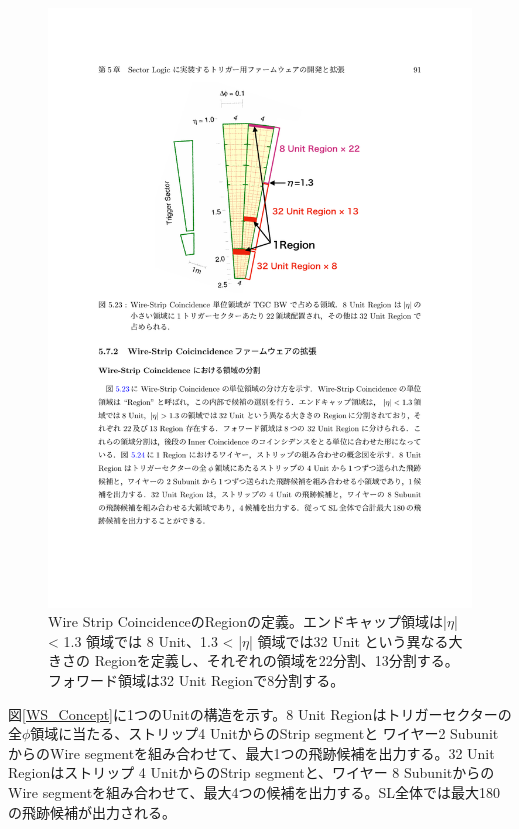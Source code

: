\begin{figure} 
\centering
\includegraphics[width=12cm]{fig/SL/WS_region.pdf}
\caption[Wire Strip Coincidence以降のRegionの分割]{Wire Strip CoincidenceのRegionの定義\cite{mt_kawamoto}。エンドキャップ領域は|$\eta$| < 1.3 領域では 8 Unit、1.3 < |$\eta$| 領域では32 Unit という異なる大きさの Regionを定義し、それぞれの領域を22分割、13分割する。フォワード領域は32 Unit Regionで8分割する。
}
\label{WS_region}
\end{figure}

図\ref{WS_Concept}に1つのUnitの構造を示す。8 Unit Regionはトリガーセクターの全$\phi$領域に当たる、ストリップ4 UnitからのStrip segmentと ワイヤー2 SubunitからのWire segmentを組み合わせて、最大1つの飛跡候補を出力する。32 Unit Regionはストリップ 4 UnitからのStrip segmentと、ワイヤー 8 SubunitからのWire segmentを組み合わせて、最大4つの候補を出力する。SL全体では最大180の飛跡候補が出力される。

